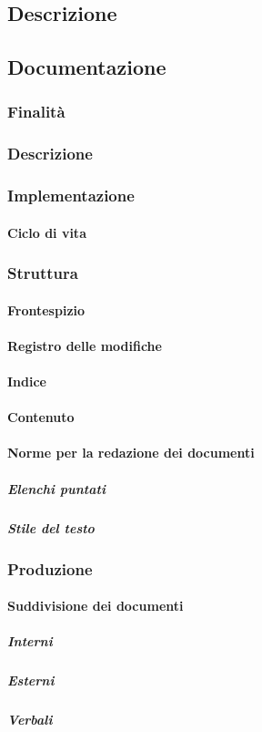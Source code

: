 \documentclass[../norme-di-progetto.tex]{subfiles}
\begin{document}
\subsection{Descrizione}
\subsection{Documentazione}
\subsubsection{Finalità}
\subsubsection{Descrizione}
\subsubsection{Implementazione}
\paragraph{Ciclo di vita}
\subsubsection{Struttura}
\paragraph{Frontespizio}
\paragraph{Registro delle modifiche}
\paragraph{Indice}
\paragraph{Contenuto}
\paragraph{Norme per la redazione dei documenti}
\subparagraph{Elenchi puntati}
\subparagraph{Stile del testo}
\subsubsection{Produzione}
\paragraph{Suddivisione dei documenti}
\subparagraph{Interni}
\subparagraph{Esterni}
\subparagraph{Verbali}
\end{document}
